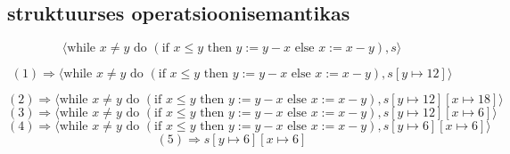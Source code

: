 \subsection{struktuurses operatsioonisemantikas}

\[
  \langle
  \text{while\ } x \neq y \text{\ do\ }
  (\text{if\ } x \leq y
    \text{\ then\ } y := y-x
    \text{\ else\ } x := x-y), s
  \rangle
\]

\[
  (1) \Rightarrow
  \langle
  \text{while\ } x \neq y \text{\ do\ }
  (\text{if\ } x \leq y
    \text{\ then\ } y := y-x
    \text{\ else\ } x := x-y),
    s[y \mapsto 12]
  \rangle
\]

\[
  (2) \Rightarrow
  \langle
  \text{while\ } x \neq y \text{\ do\ }
  (\text{if\ } x \leq y
    \text{\ then\ } y := y-x
    \text{\ else\ } x := x-y),
    s[y \mapsto 12][x \mapsto 18]
  \rangle
\]
\[
  (3) \Rightarrow
  \langle
  \text{while\ } x \neq y \text{\ do\ }
  (\text{if\ } x \leq y
    \text{\ then\ } y := y-x
    \text{\ else\ } x := x-y),
    s[y \mapsto 12][x \mapsto 6]
  \rangle
\]
\[
  (4) \Rightarrow
  \langle
  \text{while\ } x \neq y \text{\ do\ }
  (\text{if\ } x \leq y
    \text{\ then\ } y := y-x
    \text{\ else\ } x := x-y),
    s[y \mapsto 6][x \mapsto 6]
  \rangle
\]
\[
  (5) \Rightarrow
  s[y \mapsto 6][x \mapsto 6]
\]


